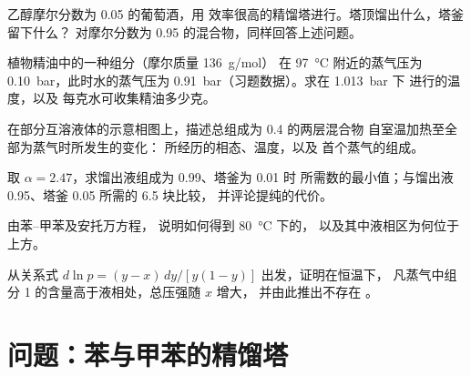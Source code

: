 \begin{exercise}[$\star\star$]\label{exo:b2:liquid-vapour-diagrams:7}
乙醇摩尔分数为 0.05 的葡萄酒，用
效率很高的精馏塔进行。塔顶馏出什么，塔釜留下什么？
对摩尔分数为 0.95 的混合物，同样回答上述问题。
\end{exercise}

\begin{exercise}[$\star\star$]\label{exo:b2:liquid-vapour-diagrams:8}
植物精油中的一种组分（摩尔质量 \qty{136}{g/mol}）
在 \qty{97}{\degreeCelsius} 附近的蒸气压为 \qty{0.10}{bar}，此时水的蒸气压为
\qty{0.91}{bar}（习题数据）。求在 \qty{1.013}{bar} 下
进行的温度，以及
每克水可收集精油多少克。
\end{exercise}

\begin{exercise}[$\star\star$]\label{exo:b2:liquid-vapour-diagrams:9}
在部分互溶液体的示意相图上，描述总组成为 0.4 的两层混合物
自室温加热至全部为蒸气时所发生的变化：
所经历的相态、温度，以及
首个蒸气的组成。
\end{exercise}

\begin{exercise}[$\star\star\star$]\label{exo:b2:liquid-vapour-diagrams:10}
取 $\alpha = 2.47$，求馏出液组成为 0.99、塔釜为 0.01 时
所需数的最小值；与馏出液 0.95、塔釜 0.05 所需的 6.5 块比较，
并评论提纯的代价。
\end{exercise}

\begin{exercise}[$\star\star\star$]\label{exo:b2:liquid-vapour-diagrams:11}
由苯–甲苯及安托万方程，
说明如何得到 \qty{80}{\degreeCelsius} 下的，
以及其中液相区为何位于上方。
\end{exercise}

\begin{exercise}[$\star\star\star$]\label{exo:b2:liquid-vapour-diagrams:12}
从关系式 $d\ln p = (y - x)\,dy/[y(1 - y)]$ 出发，证明在恒温下，
凡蒸气中组分 1 的含量高于液相处，总压强随 $x$ 增大，
并由此推出不存在
。
\end{exercise}

\section{问题：苯与甲苯的精馏塔}


